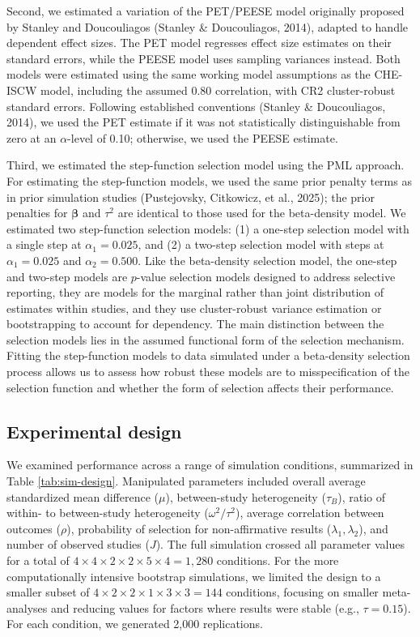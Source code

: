 \documentclass[
  american,
  man, donotrepeattitle,floatsintext]{apa7}
\begin{document}
Second, we estimated a variation of the PET/PEESE model originally proposed by Stanley and Doucouliagos (Stanley \& Doucouliagos, 2014), adapted to handle dependent effect sizes. The PET model regresses effect size estimates on their standard errors, while the PEESE model uses sampling variances instead.
Both models were estimated using the same working model assumptions as the CHE-ISCW model, including the assumed 0.80 correlation, with CR2 cluster-robust standard errors.
Following established conventions (Stanley \& Doucouliagos, 2014), we used the PET estimate if it was not statistically distinguishable from zero at an \(\alpha\)-level of 0.10; otherwise, we used the PEESE estimate.

Third, we estimated the step-function selection model using the PML approach. For estimating the step-function models, we used the same prior penalty terms as in prior simulation studies (Pustejovsky, Citkowicz, et al., 2025); the prior penalties for \(\boldsymbol\beta\) and \(\tau^2\) are identical to those used for the beta-density model.
We estimated two step-function selection models: (1) a one-step selection model with a single step at \(\alpha_1 = 0.025\), and (2) a two-step selection model with steps at \(\alpha_1 = 0.025\) and \(\alpha_2 = 0.500\).
Like the beta-density selection model, the one-step and two-step models are \(p\)-value selection models designed to address selective reporting, they are models for the marginal rather than joint distribution of estimates within studies, and they use cluster-robust variance estimation or bootstrapping to account for dependency.
The main distinction between the selection models lies in the assumed functional form of the selection mechanism. Fitting the step-function models to data simulated under a beta-density selection process allows us to assess how robust these models are to misspecification of the selection function and whether the form of selection affects their performance.

\subsection{Experimental design}\label{experimental-design}

We examined performance across a range of simulation conditions, summarized in Table \ref{tab:sim-design}. Manipulated parameters included overall average standardized mean difference (\(\mu\)), between-study heterogeneity (\(\tau_B\)), ratio of within- to between-study heterogeneity (\(\omega^2 / \tau^2\)), average correlation between outcomes (\(\rho\)), probability of selection for non-affirmative results (\(\lambda_1, \lambda_2\)), and number of observed studies (\(J\)). The full simulation crossed all parameter values for a total of \(4 \times 4 \times 2 \times 2 \times 5 \times 4 = 1,280\) conditions. For the more computationally intensive bootstrap simulations, we limited the design to a smaller subset of \(4 \times 2 \times 2 \times 1 \times 3 \times 3 = 144\) conditions, focusing on smaller meta-analyses and reducing values for factors where results were stable (e.g., \(\tau = 0.15\)). For each condition, we generated 2,000 replications.
\end{document}
